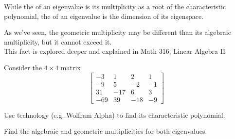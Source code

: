 \begin{applicationActivities}{4}{28}
\begin{definition}
While the  of an eigenvalue is its multiplicity as
a root of the characteristic polynomial,
the  of an eigenvalue is the dimension of its
eigenspace.
\end{definition}

\begin{fact}
  As we've seen, the geometric multiplicity may be different than
  its algebraic multiplicity, but it cannot exceed it.  
  \ \\
  This fact is explored deeper and explained in Math 316, Linear Algebra II  
  \end{fact}


\begin{activity}{20}
  Consider the \(4\times 4\) matrix
  \[
    \begin{bmatrix}
      -3 & 1 & 2 & 1 \\
      -9 & 5 & -2 & -1 \\
      31 & -17 & 6 & 3 \\
      -69 & 39 & -18 & -9
    \end{bmatrix}
  \]
  \begin{subactivity}
    Use technology (e.g. Wolfram Alpha) to find its characteristic polynomial.
  \end{subactivity}
  \begin{subactivity}
    Find the algebraic and geometric multiplicities for both eigenvalues.
  \end{subactivity}
\end{activity}



\end{applicationActivities}
